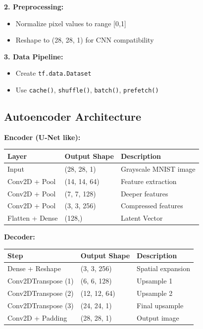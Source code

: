 \documentclass[12pt]{article}
\begin{document}
\textbf{2. Preprocessing:}
\begin{itemize}
  \item Normalize pixel values to range [0,1]
  \item Reshape to (28, 28, 1) for CNN compatibility
\end{itemize}

\textbf{3. Data Pipeline:}
\begin{itemize}
  \item Create \texttt{tf.data.Dataset}
  \item Use \texttt{cache()}, \texttt{shuffle()}, \texttt{batch()}, \texttt{prefetch()}
\end{itemize}

\subsection*{Autoencoder Architecture}

\textbf{Encoder (U-Net like):}
\begin{tabular}{@{}lll@{}}
\toprule
Layer & Output Shape & Description \\
\midrule
Input & (28, 28, 1) & Grayscale MNIST image \\
Conv2D + Pool & (14, 14, 64) & Feature extraction \\
Conv2D + Pool & (7, 7, 128) & Deeper features \\
Conv2D + Pool & (3, 3, 256) & Compressed features \\
Flatten + Dense & (128,) & Latent Vector \\
\bottomrule
\end{tabular}

\vspace{10pt}

\textbf{Decoder:}
\begin{tabular}{@{}lll@{}}
\toprule
Step & Output Shape & Description \\
\midrule
Dense + Reshape & (3, 3, 256) & Spatial expansion \\
Conv2DTranspose (1) & (6, 6, 128) & Upsample 1 \\
Conv2DTranspose (2) & (12, 12, 64) & Upsample 2 \\
Conv2DTranspose (3) & (24, 24, 1) & Final upsample \\
Conv2D + Padding & (28, 28, 1) & Output image \\
\bottomrule
\end{tabular}
\end{document}
